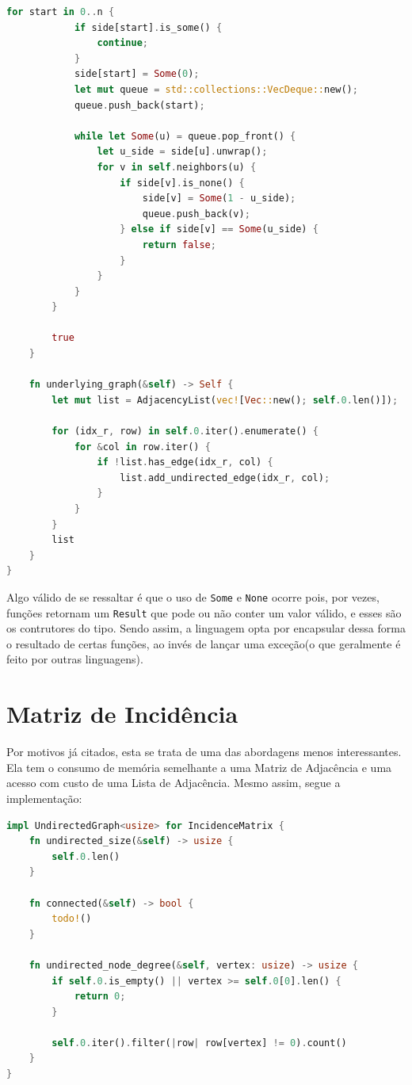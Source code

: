 \begin{lstlisting}[language=Rust, caption={Implementação de Graph na Estrutura de Dados Matriz de Adjacência}, label=list:impl_adj_list_g]
        for start in 0..n {
            if side[start].is_some() {
                continue;
            }
            side[start] = Some(0);
            let mut queue = std::collections::VecDeque::new();
            queue.push_back(start);

            while let Some(u) = queue.pop_front() {
                let u_side = side[u].unwrap();
                for v in self.neighbors(u) {
                    if side[v].is_none() {
                        side[v] = Some(1 - u_side);
                        queue.push_back(v);
                    } else if side[v] == Some(u_side) {
                        return false;
                    }
                }
            }
        }

        true
    }

    fn underlying_graph(&self) -> Self {
        let mut list = AdjacencyList(vec![Vec::new(); self.0.len()]);

        for (idx_r, row) in self.0.iter().enumerate() {
            for &col in row.iter() {
                if !list.has_edge(idx_r, col) {
                    list.add_undirected_edge(idx_r, col);
                }
            }
        }
        list
    }
}
\end{lstlisting}

Algo válido de se ressaltar é que o uso de \texttt{Some} e \texttt{None} ocorre pois, por vezes, funções retornam um \texttt{Result} que pode ou não conter um valor válido, e esses são os contrutores do tipo. Sendo assim, a linguagem opta por encapsular dessa forma o resultado de certas funções, ao invés de lançar uma exceção(o que geralmente é feito por outras linguagens).

\section{Matriz de Incidência}

Por motivos já citados, esta se trata de uma das abordagens menos interessantes. Ela tem o consumo de memória semelhante a uma Matriz de Adjacência e uma acesso com custo de uma Lista de Adjacência. Mesmo assim, segue a implementação:

\begin{lstlisting}[language=Rust, caption={Implementação de UndirectedGraph na Estrutura de Dados Matriz de Incidência}, label=list:impl_inc_mat_ug]
impl UndirectedGraph<usize> for IncidenceMatrix {
    fn undirected_size(&self) -> usize {
        self.0.len()
    }

    fn connected(&self) -> bool {
        todo!()
    }

    fn undirected_node_degree(&self, vertex: usize) -> usize {
        if self.0.is_empty() || vertex >= self.0[0].len() {
            return 0;
        }

        self.0.iter().filter(|row| row[vertex] != 0).count()
    }
}
\end{lstlisting}

